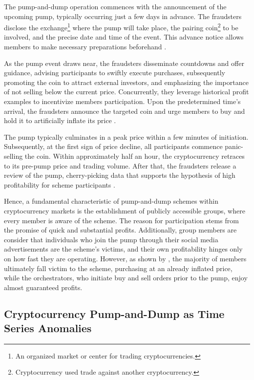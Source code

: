 \documentclass[12pt]{article}
\begin{document}
	The pump-and-dump operation commences with the announcement of the upcoming pump, typically occurring just a few days in advance.
	The fraudsters disclose the exchange\footnote{An organized market or center for trading cryptocurrencies.} where the pump will take place, the pairing coin\footnote{Cryptocurrency used trade against another cryptocurrency.} to be involved, and the precise date and time of the event.
	This advance notice allows members to make necessary preparations beforehand \citep{xu2019}.

	As the pump event draws near, the fraudsters disseminate countdowns and offer guidance, advising participants to swiftly execute purchases, subsequently promoting the coin to attract external investors, and emphasizing the importance of not selling below the current price.
	Concurrently, they leverage historical profit examples to incentivize members participation.
	Upon the predetermined time's arrival, the fraudsters announce the targeted coin and urge members to buy and hold it to artificially inflate its price \citep{xu2019}.

	The pump typically culminates in a peak price within a few minutes of initiation.
	Subsequently, at the first sign of price decline, all participants commence panic-selling the coin.
	Within approximately half an hour, the cryptocurrency retraces to its pre-pump price and trading volume.
	After that, the fraudsters release a review of the pump, cherry-picking data that supports the hypothesis of high profitability for scheme participants \citep{xu2019}.

	Hence, a fundamental characteristic of pump-and-dump schemes within cryptocurrency markets is the establishment of publicly accessible groups, where every member is aware of the scheme.
	The reason for participation stems from the promise of quick and substantial profits.
	Additionally, group members are consider that individuals who join the pump through their social media advertisements are the scheme's victims, and their own profitability hinges only on how fast they are operating.
	However, as shown by \citet{xu2019}, the majority of members ultimately fall victim to the scheme, purchasing at an already inflated price, while the orchestrators, who initiate buy and sell orders prior to the pump, enjoy almost guaranteed profits.

	\subsection{Cryptocurrency Pump-and-Dump as Time Series Anomalies}
	\label{subsec_pump_as_anomalies}
\end{document}
